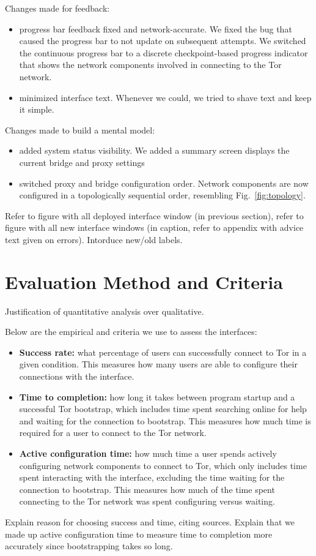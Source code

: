 \documentclass[USenglish,oneside,twocolumn]{article}
\begin{document}
{Changes made for feedback: 
\begin{itemize}
\item progress bar feedback fixed and network-accurate. We fixed the bug that caused the progress bar to not update on subsequent attempts. We switched the continuous progress bar to a discrete checkpoint-based progress indicator that shows the network components involved in connecting to the Tor network. 
\item minimized interface text. Whenever we could, we tried to shave text and keep it simple. 
\end{itemize}

Changes made to build a mental model:
\begin{itemize}
\item added system status visibility. We added a summary screen displays the current bridge and proxy settings
\item switched proxy and bridge configuration order. Network components are now configured in a topologically sequential order, resembling Fig.~\ref{fig:topology}.
\end{itemize}

Refer to figure with all deployed interface window (in previous section), refer to figure with all new interface windows (in caption, refer to appendix with advice text given on errors). Intorduce new/old labels. 
}

\section{Evaluation Method and Criteria}
\label{sec:eval}

{\color {blue}
Justification of quantitative analysis over qualitative. 

Below are the empirical and criteria we use to assess the interfaces:  
\begin{itemize}
\item {\bfseries Success rate:} what percentage of users can successfully connect to Tor in a given condition. This measures how many users are able to configure their connections with the interface. 
\item {\bfseries  Time to completion:} how long it takes between program startup and a successful Tor bootstrap, which includes time spent searching online for help and waiting for the connection to bootstrap. This measures how much time is required for a user to connect to the Tor network. 
\item {\bfseries Active configuration time:} how much time a user spends actively configuring network components to connect to Tor, which only includes time spent interacting with the interface, excluding the time waiting for the connection to bootstrap. This measures how much of the time spent connecting to the Tor network was spent configuring versus waiting. 
\end{itemize}

Explain reason for choosing success and time, citing sources. Explain that we made up active configuration time to measure time to completion more accurately since bootstrapping takes so long. 
}
\end{document}
